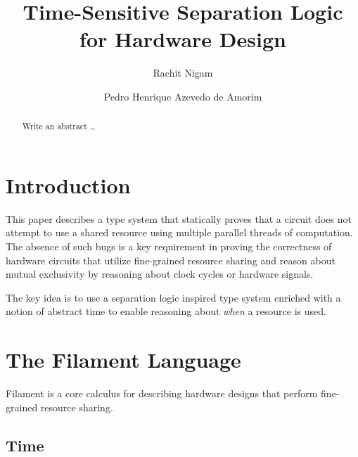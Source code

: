 \documentclass[acmsmall,review,anonymous]{acmart}
\begin{document}
\title{Time-Sensitive Separation Logic for Hardware Design}


\author{Rachit Nigam}

\author{Pedro Henrique Azevedo de Amorim}

\begin{abstract}
Write an abstract \ldots
\end{abstract}

\maketitle

\section{Introduction}

This paper describes a type system that statically proves that a circuit does not attempt to use a shared resource using multiple parallel threads of computation.
The absence of such bugs is a key requirement in proving the correctness of hardware circuits that utilize fine-grained resource sharing and reason about mutual exclusivity by reasoning about clock cycles or hardware signals.

The key idea is to use a separation logic inspired type system enriched with a notion of abstract time to enable reasoning about \emph{when} a resource is used.

\section{The Filament Language}

Filament is a core calculus for describing hardware designs that perform fine-grained resource sharing.

\subsection{Time}
\end{document}
